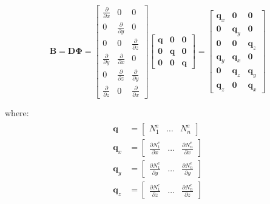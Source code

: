 \documentclass[10pt,b5paper,titlepage]{book}
\newcommand{\m}{\mathbf}
\newenvironment{eqarray}
{
    \begin{eqnarray}
        \begin{aligned}
}
{
        \end{aligned}
    \end{eqnarray}
}
\begin{document}
\begin{equation}
    \m{B} = \m{D}\m{\Phi} =
    \begin{bmatrix}
        \frac{\partial}{\partial x} & 0 & 0 \\
        0 & \frac{\partial}{\partial y} & 0 \\
        0 & 0 & \frac{\partial}{\partial z} \\
        \frac{\partial}{\partial y} & \frac{\partial}{\partial x} & 0 \\
        0 & \frac{\partial}{\partial z} & \frac{\partial}{\partial y} \\
        \frac{\partial}{\partial z} & 0 & \frac{\partial}{\partial x}
    \end{bmatrix}
    \begin{bmatrix}
        \m{q} & \m{0} & \m{0} \\
        \m{0} & \m{q} & \m{0} \\
        \m{0} & \m{0} & \m{q}
    \end{bmatrix} =
    \begin{bmatrix}
        \m{q}_x & \m{0} & \m{0} \\
        \m{0} & \m{q}_y & \m{0} \\
        \m{0} & \m{0} & \m{q}_z \\
        \m{q}_y & \m{q}_x & \m{0} \\
        \m{0} & \m{q}_z & \m{q}_y \\
        \m{q}_z & \m{0} & \m{q}_x
    \end{bmatrix}
\end{equation}

where:
\begin{eqarray}
    \m{q} &= \begin{bmatrix} N_1^e & \dots & N_n^e \end{bmatrix}\\
    \m{q}_x &= \begin{bmatrix} \frac{\partial N_1^e}{\partial x} & \dots & \frac{\partial N_n^e}{\partial x} \end{bmatrix}\\
    \m{q}_y &= \begin{bmatrix} \frac{\partial N_1^e}{\partial y} & \dots & \frac{\partial N_n^e}{\partial y} \end{bmatrix}\\
    \m{q}_z &= \begin{bmatrix} \frac{\partial N_1^e}{\partial z} & \dots & \frac{\partial N_n^e}{\partial z} \end{bmatrix}
\end{eqarray}
\end{document}
